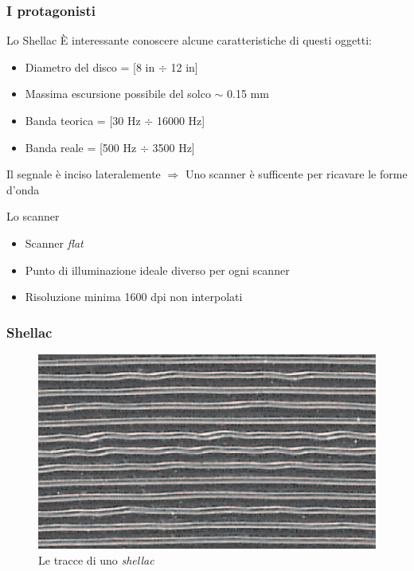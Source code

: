\begin{frame}

\frametitle{I protagonisti}

\begin{block}{Lo Shellac}
\`E interessante conoscere alcune caratteristiche di questi oggetti:
\begin{itemize}
\item Diametro del disco = [8 in $\div$ 12 in]
\item Massima escursione possibile del solco $\sim$ 0.15 mm
\item Banda teorica = [30 Hz $\div$ 16000 Hz]
\item Banda reale = [500 Hz $\div$ 3500 Hz] 
\end{itemize}
Il segnale è inciso lateralemente $\Rightarrow$ Uno scanner è 
sufficente per ricavare le forme d'onda
\end{block}

\begin{block}{Lo scanner}
\begin{itemize}
\item Scanner \emph{flat}
\item Punto di illuminazione ideale diverso per ogni scanner
\item Risoluzione minima 1600 dpi non interpolati
\end{itemize}
\end{block}
\end{frame}

\begin{frame}
\frametitle{Shellac}
\begin{figure}
\includegraphics[width=\textwidth]{immagini/shellac-track.png}
\caption{Le tracce di uno \emph{shellac}}
\end{figure}
\end{frame}


